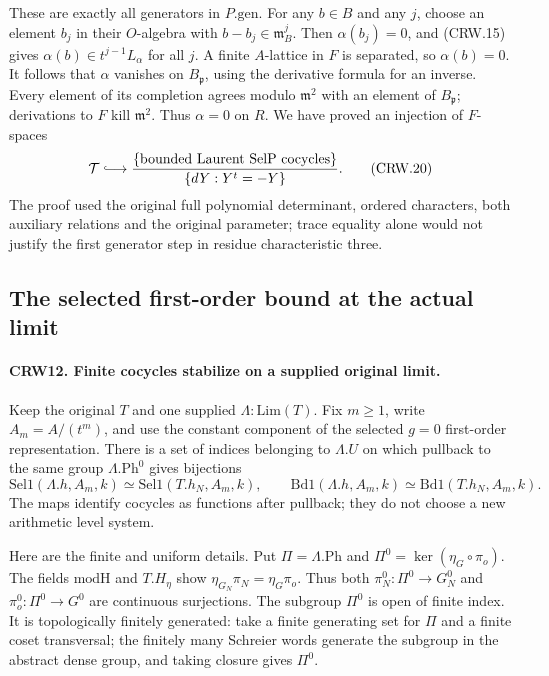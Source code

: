 These are exactly all generators in $P.\mathrm{gen}$.
For any $b\in B$ and any $j$, choose an element $b_j$ in
their $O$-algebra with $b-b_j\in\mathfrak m_B^j$.
Then $\alpha(b_j)=0$, and (CRW.15) gives
$\alpha(b)\in t^{j-1}L_\alpha$ for all $j$.
A finite $A$-lattice in $F$ is separated, so $\alpha(b)=0$.
It follows that $\alpha$ vanishes on $B_{\mathfrak p}$,
using the derivative formula for an inverse.
Every element of its completion agrees modulo
$\mathfrak m^2$ with an element of $B_{\mathfrak p}$;
derivations to $F$ kill $\mathfrak m^2$.
Thus $\alpha=0$ on $R$.
We have proved an injection of $F$-spaces
\[
 \mathcal T\lhook\joinrel\longrightarrow
 \frac{\{\text{bounded Laurent SelP cocycles}\}}
      {\{dY:Y^t=-Y\}}.                            \tag{CRW.20}
\]
The proof used the original full polynomial determinant,
ordered characters, both auxiliary relations and the
original parameter; trace equality alone would not justify
the first generator step in residue characteristic three.

\subsection{The selected first-order bound at the actual limit}

\paragraph{CRW12. Finite cocycles stabilize on a supplied original limit.}
\label{claim:CRW12}
Keep the original $T$ and one supplied $\Lambda:\mathrm{Lim}(T)$.
Fix $m\ge1$, write $A_m=A/(t^m)$, and use the constant
component of the selected $g=0$ first-order representation.
There is a set of indices belonging to $\Lambda.U$ on which
pullback to the same group $\Lambda.\mathrm{Ph}^0$ gives
bijections
\[
 \mathrm{Sel1}(\Lambda.h,A_m,k)
     \simeq\mathrm{Sel1}(T.h_N,A_m,k),\qquad
 \mathrm{Bd1}(\Lambda.h,A_m,k)
     \simeq\mathrm{Bd1}(T.h_N,A_m,k).               \tag{CRW.21}
\]
The maps identify cocycles as functions after pullback;
they do not choose a new arithmetic level system.

Here are the finite and uniform details.  Put
$\Pi=\Lambda.\mathrm{Ph}$ and
$\Pi^0=\ker(\eta_G\circ\pi_o)$.
The fields $\mathrm{modH}$ and $T.H_\eta$ show
$\eta_{G_N}\pi_N=\eta_G\pi_o$.
Thus both $\pi_N^0:\Pi^0\to G_N^0$ and
$\pi_o^0:\Pi^0\to G^0$ are continuous surjections.
The subgroup $\Pi^0$ is open of finite index.  It is
topologically finitely generated: take a finite generating
set for $\Pi$ and a finite coset transversal; the finitely
many Schreier words generate the subgroup in the abstract
dense group, and taking closure gives $\Pi^0$.


